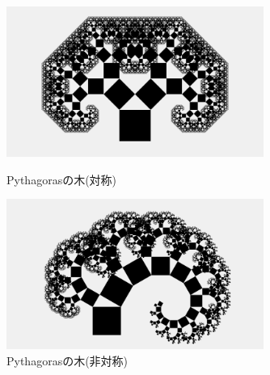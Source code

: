 \documentclass[dvipdfmx]{jsarticle}
\theoremstyle{definition}
\begin{document}
\begin{figure}[H]
    \begin{minipage}{0.5\hsize}
        \centering
        \includegraphics[width=0.75\textwidth]{figure/others/tree/pythagoras_tree.png}
        \caption{Pythagorasの木(対称)}
    \end{minipage}
    \begin{minipage}{0.49\hsize}
        \centering
        \includegraphics[width=0.75\textwidth]{figure/others/tree/pythagoras_tree_asy.png}
        \caption{Pythagorasの木(非対称)}
    \end{minipage}
\end{figure}
\end{document}
